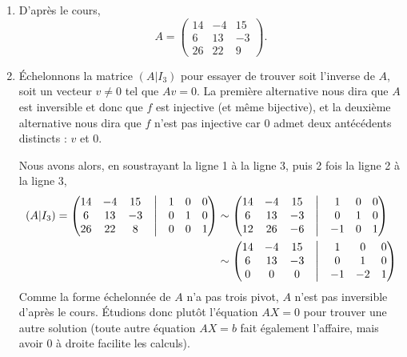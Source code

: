 {\begin{enumerate}
			\[ f( \begin{pmatrix}1\\2\\-1\end{pmatrix} ) =  \begin{pmatrix}14\\6\\26\end{pmatrix} + 2 \begin{pmatrix}-4\\13\\22\end{pmatrix} - \begin{pmatrix}15\\-3\\9\end{pmatrix} =  \begin{pmatrix}-9\\35\\61\end{pmatrix}. \]
		\item
		D'après le cours,
			\[ A = \begin{pmatrix} 14 & -4 & 15 \\ 6 & 13 & -3 \\ 26 & 22 & 9 \end{pmatrix}. \]
		\item
		Échelonnons la matrice $(A | I_3)$ pour essayer de trouver soit l'inverse de $A$, soit un vecteur $v\neq0$ tel que $Av = 0$.
		La première alternative nous dira que $A$ est inversible et donc que $f$ est injective (et même bijective), et la deuxième alternative nous dira que $f$ n'est pas injective car $0$ admet deux antécédents distincts : $v$ et $0$.
		
		Nous avons alors, en soustrayant la ligne 1 à la ligne 3, puis 2 fois la ligne 2 à la ligne 3,
		\begin{align*}
			(A|I_3) = \begin{pmatrix} 14 & -4 & 15 & \bigm| & 1 & 0 & 0 \\ 6 & 13 & -3 & \bigm| & 0 & 1 & 0 \\ 26 & 22 & 8 & \bigm| & 0 & 0 & 1 \end{pmatrix}
			&\sim
			\begin{pmatrix} 14 & -4 & 15 & \bigm| & 1 & 0 & 0 \\ 6 & 13 & -3 & \bigm| & 0 & 1 & 0 \\ 12 & 26 & -6 & \bigm| & -1 & 0 & 1 \end{pmatrix}
			\\
			&\sim
			\begin{pmatrix} 14 & -4 & 15 & \bigm| & 1 & 0 & 0 \\ 6 & 13 & -3 & \bigm| & 0 & 1 & 0 \\ 0 & 0 & 0 & \bigm| & -1 & -2 & 1 \end{pmatrix}
		\end{align*}
		Comme la forme échelonnée de $A$ n'a pas trois pivot, $A$ n'est pas inversible d'après le cours.
		Étudions donc plutôt l'équation $AX=0$ pour trouver une autre solution (toute autre équation $AX=b$ fait également l'affaire, mais avoir 0 à droite facilite les calculs).
		

\end{enumerate}}
